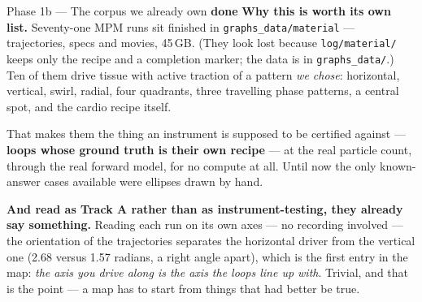 \documentclass[11pt,a4paper]{article}
\newcommand{\code}[1]{\texttt{#1}}
\newcommand{\dn}{\textcolor{good}{\textbf{done}}}
\begin{document}
\begin{phasebox}{Phase 1b --- The corpus we already own \hfill \dn}
\textbf{Why this is worth its own list.} Seventy-one MPM runs sit finished in
\code{graphs\_data/material} --- trajectories, specs and movies, 45\,GB. (They look lost because
\code{log/material/} keeps only the recipe and a completion marker; the data is in
\code{graphs\_data/}.) Ten of them drive tissue with active traction of a pattern \emph{we chose}:
horizontal, vertical, swirl, radial, four quadrants, three travelling phase patterns, a central
spot, and the cardio recipe itself.

That makes them the thing an instrument is supposed to be certified against --- \textbf{loops whose
ground truth is their own recipe} --- at the real particle count, through the real forward model,
for no compute at all. Until now the only known-answer cases available were ellipses drawn by hand.

\textbf{And read as Track A rather than as instrument-testing, they already say something.} Reading
each run on its own axes --- no recording involved --- the orientation of the trajectories separates
the horizontal driver from the vertical one (2.68 versus 1.57 radians, a right angle apart), which
is the first entry in the map: \emph{the axis you drive along is the axis the loops line up with}.
Trivial, and that is the point --- a map has to start from things that had better be true.


\end{phasebox}
\end{document}
